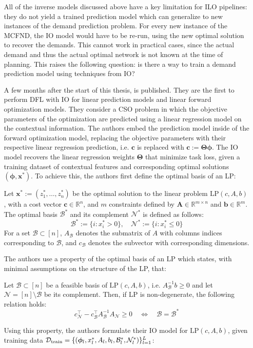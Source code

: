All of the inverse models discussed above have a key limitation for ILO pipelines: they do not yield a trained prediction model which can generalize to new instances of the demand prediction problem. For every new instance of the MCFND, the IO model would have to be re-run, using the new optimal solution to recover the demands. This cannot work in practical cases, since the actual demand and thus the actual optimal network is not known at the time of planning. This raises the following question: is there a way to train a demand prediction model using techniques from IO? 

A few months after the start of this thesis, \cite{sunMaximumOptimalityMargin2023} is published. They are the first to perform DFL with IO for linear prediction models and linear forward optimization models. They consider a CSO problem in which the objective parameters of the optimization are predicted using a linear regression model on the contextual information. The authors embed the prediction model inside of the forward optimization model, replacing the objective parameters with their respective linear regression prediction, i.e. $\bm{c}$ is replaced with $\hat{\bm{c}} := \bm{\Theta} \bm{\phi}$. The IO model recovers the linear regression weights $\bm{\Theta}$ that minimize task loss, given a training dataset of contextual features and corresponding optimal solutions $(\bm{\phi}, \bm{x}^*)$. To achieve this, the authors first define the optimal basis of an LP:
\begin{defin}
Let $\bm{x}^* := (z_1^*, \ldots, z_n^*)$ be the optimal solution to the linear problem $\mathrm{LP}(c, A, b)$, with a cost vector $\bm{c} \in \mathbb{R}^n$, and $m$ constraints defined by $\bm{A} \in \mathbb{R}^{m\times n}$ and $\bm{b} \in \mathbb{R}^m$. The optimal basis $\mathcal{B}^*$ and its complement $\mathcal{N}^*$ is defined as follows:
$$\mathcal{B}^* := \{i : x^*_i > 0\}, \quad \mathcal{N}^* := \{i : x^*_i \leq 0\}$$
For a set $\mathcal{B} \subset [n]$, $A_{\mathcal{B}}$ denotes the submatrix of $A$ with columns indices corresponding to $\mathcal{B}$, and $c_\mathcal{B}$ denotes the subvector with corresponding dimensions.
\end{defin}
The authors use a property of the optimal basis of an LP which states, with minimal assumptions on the structure of the LP, that:
\begin{lemma}
    \label{lemma:litrev:optimality}
    Let $\mathcal{B} \subset [n]$ be a feasible basis of $\mathrm{LP}(c, A, b)$, i.e. $A^{-1}_{\mathcal{B}}b \geq 0$ and let $\mathcal{N} = [n] \setminus \mathcal{B}$ be its complement. Then, if LP is non-degenerate, the following relation holds:
    $$c^\top_\mathcal{N} - c^\top_\mathcal{B} A^{-1}_\mathcal{B}A_\mathcal{N} \geq 0 \quad\Leftrightarrow\quad \mathcal{B} = \mathcal{B}^*$$ 
\end{lemma}
Using this property, the authors formulate their IO model for $\mathrm{LP}(c, A, b)$, given training data $\mathcal{D}_\mathrm{train} = \{({\bm{\phi}}_l, x^*_l, A_l, b_l, \mathcal{B}^*_l, \mathcal{N}^*_l)\}_{l=1}^L$:

